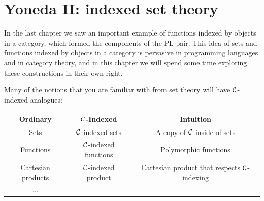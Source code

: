 

\chapter{Yoneda II: indexed set theory}


In the last chapter we saw an important example of functions indexed by objects
in a category, which formed the components of the PL-pair. This idea of sets and
functions indexed by objects in a category is pervasive in programming languages
and in category theory, and in this chapter we will spend some time 
exploring these constructions in their own right.

Many of the notions that you are familiar with from set theory will have 
$\mathcal C$-indexed analogues:

\begin{fullwidth}
 \begin{center}
 \begin{tabular}{ccc}
  \toprule
  \textbf{Ordinary} & \textbf{$\mathcal C$-Indexed} & \textbf{Intuition} \\
  \midrule 
  Sets & $\mathcal C$-indexed sets & A copy of $\mathcal C$ inside of sets \\
  Functions & $\mathcal C$-indexed functions & Polymorphic functions \\
  Cartesian products & $\mathcal C$-indexed product & Cartesian product that respects $\mathcal C$-indexing \\
  ... & & \\
  \bottomrule
\end{tabular}
\end{center}
\end{fullwidth}

